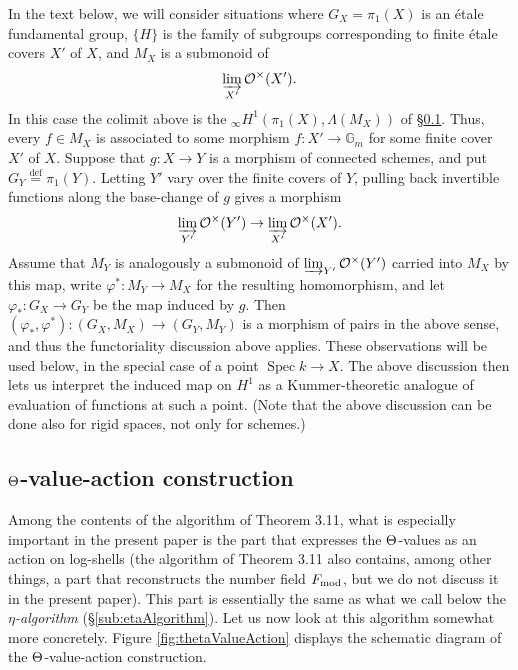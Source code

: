 \documentclass[12pt, reqno, a4paper]{amsart}
\def\eqdef{\stackrel{\textrm{def}}{=}} %
\def\bG{\mathbb{G}}
\def\cO{\mathcal{O}} %
\DeclareMathOperator{\Spec}{Spec}
\begin{document}
In the text below, we will consider situations where $G_X = \pi_1(X)$ is an \'etale fundamental group, $\{H\}$ is the family of subgroups corresponding to finite \'etale covers $X'$ of $X$, and $M_X$ is a submonoid of
\[ \varinjlim_{X'} \cO^\times(X'). \]
In this case the colimit above is the ${}_{\infty}H^1(\pi_1(X),\Lambda(M_X))$ of \S\ref{sub:thetaValueActionConstruction}.
Thus, every $f \in M_X$ is associated to some morphism $f\colon X' \to \bG_m$ for some finite cover $X'$ of $X$.
Suppose that $g\colon X \to Y$ is a morphism of connected schemes, and put $G_Y \eqdef \pi_1(Y)$.
Letting $Y'$ vary over the finite covers of $Y$, pulling back invertible functions along the base-change of $g$ gives a morphism
\[ \varinjlim_{Y'} \cO^\times(Y') \to \varinjlim_{X'} \cO^\times(X'). \]
Assume that $M_Y$ is analogously a submonoid of $\varinjlim_{Y'} \cO^\times(Y')$ carried into $M_X$ by this map, write $\varphi^*\colon M_Y \to M_X$ for the resulting homomorphism, and let $\varphi_*\colon G_X \to G_Y$ be the map induced by $g$.
Then $(\varphi_*,\varphi^*)\colon (G_X,M_X) \to (G_Y,M_Y)$ is a morphism of pairs in the above sense, and thus the functoriality discussion above applies.
These observations will be used below, in the special case of a point $\Spec k \to X$.
The above discussion then lets us interpret the induced map on $H^1$ as a Kummer-theoretic analogue of evaluation of functions at such a point.
(Note that the above discussion can be done also for rigid spaces, not only for schemes.)

\subsection{\(\Th\)-value-action construction}\label{sub:thetaValueActionConstruction}
Among the contents of the algorithm of Theorem 3.11, what is especially important in the present paper is the part that expresses the \(\Th\)-values as an action on log-shells (the algorithm of Theorem 3.11 also contains, among other things, a part that reconstructs the number field $\Fmod$, but we do not discuss it in the present paper).
This part is essentially the same as what we call below the {\it $\eta$-algorithm} (\S\ref{sub:etaAlgorithm}).
Let us now look at this algorithm somewhat more concretely.
Figure \ref{fig:thetaValueAction} displays the schematic diagram of the \(\Th\)-value-action construction.
\end{document}

